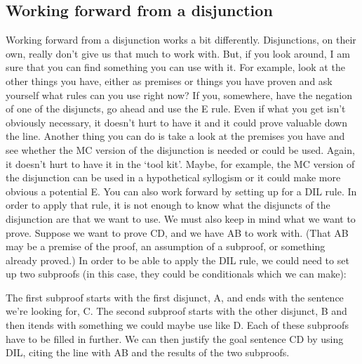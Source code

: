\subsection{Working forward from a disjunction}

Working forward from a disjunction works a bit differently. Disjunctions, on their own, really don't give us that much to work with. But, if you look around, I am sure that you can find something you can use with it. For example, look at the other things you have, either as premises or things you have proven and ask yourself what rules can you use right now? If you, somewhere, have the negation of one of the disjuncts, go ahead and use the \eor E rule. Even if what you get isn't obviously necessary, it doesn't hurt to have it and it could prove valuable down the line. Another thing you can do is take a look at the premises you have and see whether the MC version of the disjunction is needed or could be used. Again, it doesn't hurt to have it in the `tool kit'. Maybe, for example, the MC version of the disjunction can be used in a hypothetical syllogism or it could make more obvious a potential \eif E. You can also work forward by setting up for a DIL rule. In order to apply that rule, it is not enough to know what the disjuncts of the disjunction are that we want to use. We must also keep in mind what we want to prove. Suppose we want to prove C\eor D, and we have A\eor B to work with. (That A\eor B may be a premise of the proof, an assumption of a subproof, or something already proved.) In order to be able to apply the DIL rule, we could need to set up two subproofs (in this case, they could be conditionals which we can make):

\begin{fitchproof}
\ellipsesline			
{}
\open
{}
\ellipsesline		
{}			
\close
{}	
\open
{}
\ellipsesline		
{}			
\close
{}	
 
\end{fitchproof}

The first subproof starts with the first disjunct, A, and ends with the sentence we’re looking for, C. The second subproof starts with the other disjunct, B and then itends with something we could maybe use like D. Each of these subproofs have to be filled in further. We can then justify the goal sentence C\eor D by using DIL, citing the line with A\eor B and the results of the two subproofs.

